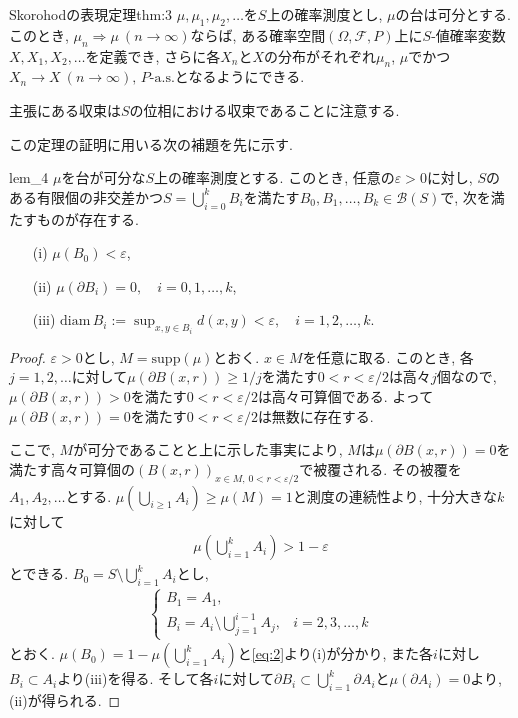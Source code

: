 \begin{theorem}{Skorohodの表現定理}{thm:3}
    $\mu,\mu_1,\mu_2,\dots$を$S$上の確率測度とし, $\mu$の台は可分とする.
    このとき, $\mu_n\Rightarrow\mu~(n\to\infty)$ならば, ある確率空間$(\Omega,\mathcal{F},P)$上に$S$-値確率変数$X,X_1,X_2,\dots$を定義でき, さらに各$X_n$と$X$の分布がそれぞれ$\mu_n$, $\mu$でかつ$X_n\to X~(n\to\infty),\,\text{$P$-a.s.}$となるようにできる.
\end{theorem}

主張にある収束は$S$の位相における収束であることに注意する.

この定理の証明に用いる次の補題を先に示す.

\begin{lemma}{}{lem_4}
    $\mu$を台が可分な$S$上の確率測度とする.
    このとき, 任意の$\varepsilon>0$に対し, $S$のある有限個の非交差かつ$S=\bigcup_{i=0}^kB_i$を満たす$B_0,B_1,\dots,B_k\in\mathcal{B}(S)$で, 次を満たすものが存在する.
    \begin{itemize}
        \item[(i)] $\mu(B_0)<\varepsilon$,
        \item[(ii)] $\mu(\partial B_i)=0, \quad i=0,1,\dots,k$,
        \item[(iii)] $\textrm{diam}\,B_i:= \sup_{x,y\in B_i}d(x,y)<\varepsilon, \quad i=1,2,\dots,k$.
    \end{itemize}
\end{lemma}
\begin{proof}
    $\varepsilon>0$とし, $M=\textrm{supp}(\mu)$とおく.
    $x\in M$を任意に取る.
    このとき, 各$j=1,2,\dots$に対して$\mu(\partial B(x,r))\geq 1/j$を満たす$0<r<\varepsilon/2$は高々$j$個なので, $\mu(\partial B(x,r))>0$を満たす$0<r<\varepsilon/2$は高々可算個である.
    よって$\mu(\partial B(x,r))=0$を満たす$0<r<\varepsilon/2$は無数に存在する.

    ここで, $M$が可分であることと上に示した事実により, $M$は$\mu(\partial B(x,r))=0$を満たす高々可算個の$(B(x,r))_{x\in M,\,0<r<\varepsilon/2}$で被覆される.
    その被覆を$A_1,A_2,\dots$とする.
    $\mu(\bigcup_{i\geq 1}A_i)\geq \mu(M)=1$と測度の連続性より, 十分大きな$k$に対して
    \begin{align}
        \mu\left(\bigcup_{i=1}^k A_i\right)>1-\varepsilon \label{eq:2}
    \end{align}
    とできる.
    $B_0=S\setminus \bigcup_{i=1}^k A_i$とし,
    \begin{align*}
        \begin{cases}
            B_1 = A_1,                                                &               \\[.5em]
            \displaystyle B_i = A_i \setminus \bigcup_{j=1}^{i-1}A_j, & i=2,3,\dots,k
        \end{cases}
    \end{align*}
    とおく.
    $\mu(B_0)=1-\mu(\bigcup_{i=1}^k A_i)$と\eqref{eq:2}より(i)が分かり, また各$i$に対し$B_i\subset A_i$より(iii)を得る.
    そして各$i$に対して$\partial B_i\subset \bigcup_{i=1}^{k}\partial A_i$と$\mu(\partial A_i)=0$より, (ii)が得られる.
\end{proof}

